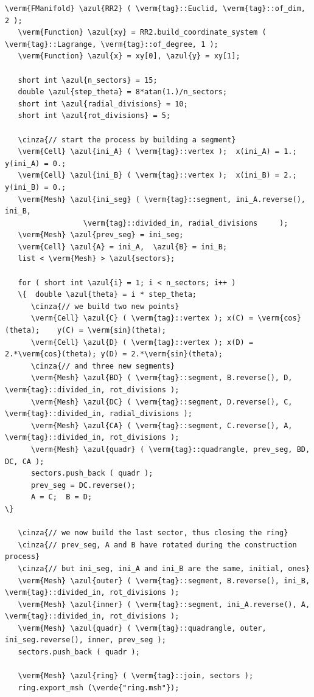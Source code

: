\begin{Verbatim}[commandchars=\\\{\},formatcom=\small\tt,frame=single,
   label=main-\ref{\numb section 9.\numb parag 2}.cpp,rulecolor=\color{coment},
   baselinestretch=0.94,framesep=2mm                                            ]
   \verm{FManifold} \azul{RR2} ( \verm{tag}::Euclid, \verm{tag}::of_dim, 2 );
   \verm{Function} \azul{xy} = RR2.build_coordinate_system ( \verm{tag}::Lagrange, \verm{tag}::of_degree, 1 );
   \verm{Function} \azul{x} = xy[0], \azul{y} = xy[1];

   short int \azul{n_sectors} = 15;
   double \azul{step_theta} = 8*atan(1.)/n_sectors;
   short int \azul{radial_divisions} = 10;
   short int \azul{rot_divisions} = 5;

   \cinza{// start the process by building a segment}
   \verm{Cell} \azul{ini_A} ( \verm{tag}::vertex );  x(ini_A) = 1.;  y(ini_A) = 0.;
   \verm{Cell} \azul{ini_B} ( \verm{tag}::vertex );  x(ini_B) = 2.;  y(ini_B) = 0.;
   \verm{Mesh} \azul{ini_seg} ( \verm{tag}::segment, ini_A.reverse(), ini_B,
                  \verm{tag}::divided_in, radial_divisions     );
   \verm{Mesh} \azul{prev_seg} = ini_seg;
   \verm{Cell} \azul{A} = ini_A,  \azul{B} = ini_B;
   list < \verm{Mesh} > \azul{sectors};

   for ( short int \azul{i} = 1; i < n_sectors; i++ )
   \{  double \azul{theta} = i * step_theta;
      \cinza{// we build two new points}
      \verm{Cell} \azul{C} ( \verm{tag}::vertex ); x(C) = \verm{cos}(theta);    y(C) = \verm{sin}(theta);
      \verm{Cell} \azul{D} ( \verm{tag}::vertex ); x(D) = 2.*\verm{cos}(theta); y(D) = 2.*\verm{sin}(theta);
      \cinza{// and three new segments}
      \verm{Mesh} \azul{BD} ( \verm{tag}::segment, B.reverse(), D, \verm{tag}::divided_in, rot_divisions );
      \verm{Mesh} \azul{DC} ( \verm{tag}::segment, D.reverse(), C, \verm{tag}::divided_in, radial_divisions );
      \verm{Mesh} \azul{CA} ( \verm{tag}::segment, C.reverse(), A, \verm{tag}::divided_in, rot_divisions );
      \verm{Mesh} \azul{quadr} ( \verm{tag}::quadrangle, prev_seg, BD, DC, CA );
      sectors.push_back ( quadr );
      prev_seg = DC.reverse();
      A = C;  B = D;                                                             \}

   \cinza{// we now build the last sector, thus closing the ring}
   \cinza{// prev_seg, A and B have rotated during the construction process}
   \cinza{// but ini_seg, ini_A and ini_B are the same, initial, ones}
   \verm{Mesh} \azul{outer} ( \verm{tag}::segment, B.reverse(), ini_B, \verm{tag}::divided_in, rot_divisions );
   \verm{Mesh} \azul{inner} ( \verm{tag}::segment, ini_A.reverse(), A, \verm{tag}::divided_in, rot_divisions );
   \verm{Mesh} \azul{quadr} ( \verm{tag}::quadrangle, outer, ini_seg.reverse(), inner, prev_seg );
   sectors.push_back ( quadr );
   
   \verm{Mesh} \azul{ring} ( \verm{tag}::join, sectors );
   ring.export_msh (\verde{"ring.msh"});
\end{Verbatim}

